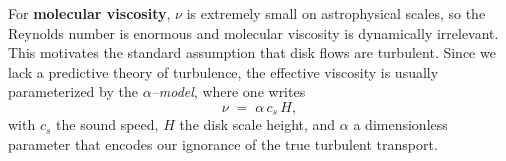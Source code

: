 \medskip
\noindent
\par
For \textbf{molecular viscosity}, $\nu$ is extremely small on astrophysical scales, 
so the Reynolds number is enormous and molecular viscosity is dynamically irrelevant.  
This motivates the standard assumption that disk flows are turbulent.  
Since we lack a predictive theory of turbulence, the effective viscosity is usually parameterized 
by the \emph{$\alpha$--model}, where one writes
\[
\nu \;=\; \alpha \, c_s \, H,
\]
with $c_s$ the sound speed, $H$ the disk scale height, and $\alpha$ a dimensionless parameter
that encodes our ignorance of the true turbulent transport.
